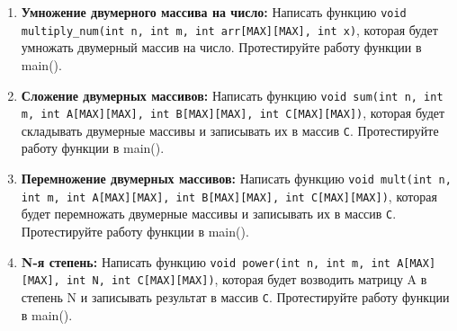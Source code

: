 \documentclass{article}
\begin{document}
\begin{enumerate}
\newpage

\subsection*{Двумерные циклы и массивы}
\begin{lstlisting}
// Зададим константу MAX = 100
#define MAX 100
void print_array(int n, int m, int arr[MAX][MAX]) {
	for (int i = 0; i < n; i++) {
		for (int j = 0; j < m; j++)
			printf("%d ", arr[i][j]);
		printf("\n");
	}
}
int main() {
    // Создаём массивы с запасом
	int a[MAX][MAX] = {{7, 7, 2}, {1, 8, 3}, {2, 1, 6}};
	int b[MAX][MAX] = {{5, 2, 9}, {-4, 2, 11}, {7, 1, -5}};
	// Печатаем только 9 элементов
	print_array(3, 3, a);
}
\end{lstlisting}
\item \textbf{Умножение двумерного массива на число:} Написать функцию \texttt{void multiply\_num(int n, int m, int arr[MAX][MAX], int x)}, которая будет умножать двумерный массив на число. Протестируйте работу функции в main().
\item \textbf{Сложение двумерных массивов:} Написать функцию \texttt{void sum(int n, int m, int A[MAX][MAX], int B[MAX][MAX], int C[MAX][MAX])}, которая будет складывать двумерные массивы и записывать их в массив \texttt{C}. Протестируйте работу функции в main().
\item \textbf{Перемножение двумерных массивов:} Написать функцию \texttt{void mult(int n, int m, int A[MAX][MAX], int B[MAX][MAX], int C[MAX][MAX])}, которая будет перемножать двумерные массивы и записывать их в массив \texttt{C}. Протестируйте работу функции в main().
\item \textbf{N-я степень:} Написать функцию \texttt{void power(int n, int m, int A[MAX][MAX], int N, int C[MAX][MAX])}, которая будет возводить матрицу A в степень N и записывать результат в массив \texttt{C}. Протестируйте работу функции в main().


\end{enumerate}
\end{document}
